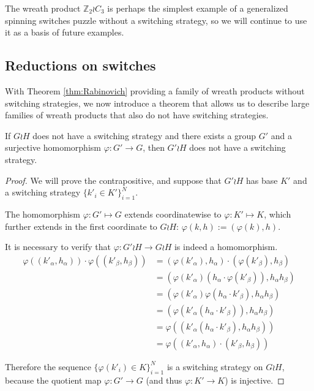 The wreath product $\mathbb Z_2 \wr C_3$ is perhaps the simplest example of a
generalized spinning switches puzzle without a switching strategy,
so we will continue to use it as a basis of future examples.

\subsection{Reductions on switches}
With Theorem \ref{thm:Rabinovich} providing a family of wreath products without
switching strategies, we now introduce a theorem that allows us to
describe large families of wreath products that also do not have switching
strategies.
\begin{theorem}
  If $G \wr H$ does not have a switching strategy and there exists a group $G'$
  and a surjective homomorphism $\varphi \colon G' \rightarrow G$,
  then ${G'} \wr H$ does not have a switching
  strategy.
  \label{thm:SwitchReduction}
\end{theorem}
\begin{proof}
  We will prove the contrapositive, and suppose that $G' \wr H$ has base $K'$
  and a switching strategy $\{k'_i \in K'\}_{i=1}^N$.

  The homomorphism
  $\varphi\colon G' \mapsto G$
  extends coordinatewise to
  $\varphi \colon K' \mapsto K$,
  which further extends in the first coordinate to $G \wr H$:
  $\varphi(k,h) := (\varphi(k), h)$.

  It is necessary to verify that $\varphi\colon G' \wr H \rightarrow G \wr H$
  is indeed a homomorphism.
  \begin{align*}
    \varphi((k'_\alpha, h_\alpha)) \cdot \varphi((k'_\beta, h_\beta))
    &= (\varphi(k'_\alpha), h_\alpha) \cdot (\varphi(k'_\beta), h_\beta) \\
    &= (\varphi(k'_\alpha)(h_\alpha\cdot\varphi(k'_\beta)), h_\alpha h_\beta) \\
    &= (\varphi(k'_\alpha)\varphi(h_\alpha\cdot k'_\beta), h_\alpha h_\beta) \\
    &= (\varphi(k'_\alpha(h_\alpha\cdot k'_\beta)), h_\alpha h_\beta) \\
    &= \varphi((k'_\alpha(h_\alpha\cdot k'_\beta), h_\alpha h_\beta)) \\
    &= \varphi((k'_\alpha, h_\alpha) \cdot (k'_\beta, h_\beta))
  \end{align*}

  Therefore the sequence $\{\varphi(k'_i) \in K\}_{i=1}^N$ is a
  switching strategy on $G \wr H$, because the quotient map
  $\varphi \colon G' \rightarrow G$
  (and thus $\varphi \colon K' \rightarrow K$)
  is injective.
\end{proof}
